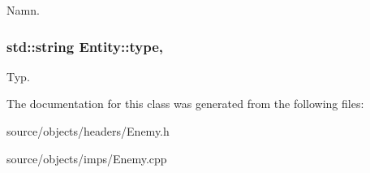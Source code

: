 Namn. 

\hypertarget{classEntity_a298a9ebf2474bb00874b5ff6a0d637ef}{
\subsubsection[{type}]{\setlength{\rightskip}{0pt plus 5cm}std\+::string Entity\+::type\hspace{0.3cm}{\ttfamily [protected]}, {\ttfamily [inherited]}}}\label{classEntity_a298a9ebf2474bb00874b5ff6a0d637ef}


Typ. 



The documentation for this class was generated from the following files\+:\begin{DoxyCompactItemize}
\item 
source/objects/headers/Enemy.\+h\item 
source/objects/imps/Enemy.\+cpp\end{DoxyCompactItemize}

